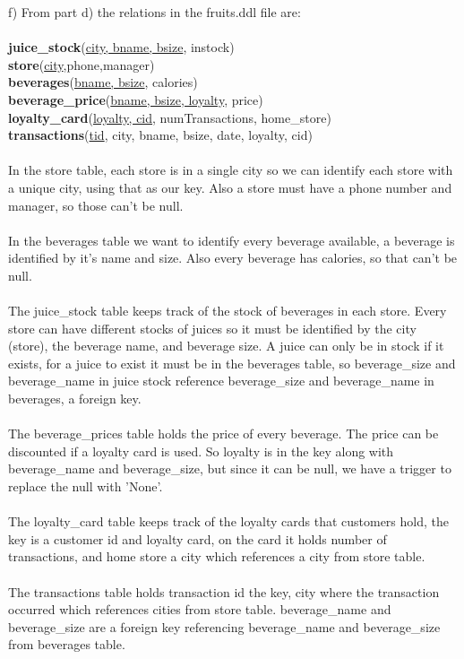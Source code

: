 \documentclass{article}
\begin{document}
\begin{enumerate}
	f) From part d) the relations in the fruits.ddl file are:\\\\
	\textbf{juice\_stock}(\underline{city, bname, bsize}, instock)\\
		 \textbf{store}(\underline{city},phone,manager)\\
		 \textbf{beverages}(\underline{bname, bsize}, calories)\\
		 \textbf{beverage\_price}(\underline{bname, bsize, loyalty}, price)\\
		 \textbf{loyalty\_card}(\underline{loyalty, cid}, numTransactions, home\_store)\\
		 \textbf{transactions}(\underline{tid}, city, bname, bsize, date, loyalty, cid)\\\\
		 In the store table, each store is in a single city so we can identify each store with a unique city, using that as our key. Also a store must have a phone number and manager, so those can't be null.\\\\
		 In the beverages table we want to identify every beverage available, a beverage is identified by it's name and size. Also every beverage has calories, so that can't be null.\\\\
		 The juice\_stock table keeps track of the stock of beverages in each store. 
		 Every store can have different stocks of juices so it must be identified by the city (store), the beverage name, and beverage size. A juice can only be in stock if it exists, for a juice to exist it must be in the beverages table, so beverage\_size and beverage\_name in juice stock reference beverage\_size and beverage\_name in beverages, a foreign key.\\\\
		 The beverage\_prices table holds the price of every beverage. The price can be discounted if a loyalty card is used. So loyalty is in the key along with beverage\_name and beverage\_size, but since it can be null, we have a trigger to replace the null with 'None'. \\\\
		 The loyalty\_card table keeps track of the loyalty cards that customers hold, the key is a customer id and loyalty card, on the card it holds number of transactions, and home store a city which references a city from store table.\\\\
		 The transactions table holds transaction id the key, city where the transaction occurred which references cities from store table. beverage\_name and beverage\_size are a foreign key referencing  beverage\_name and beverage\_size from beverages table.

\end{enumerate}
\end{document}
